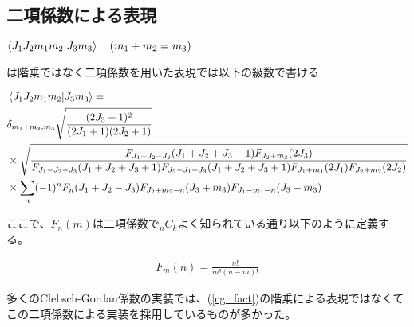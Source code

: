 \subsection{二項係数による表現}

\begin{comment}
この式の階乗の分数の部分を二項係数(binomial)にした公式もある
多くのCG係数を計算するコードでは二項係数で計算しているものがほとんどであった。

漸化式を再帰的に計算するよりも級数で直接計算する方法の方が効率が良い
階乗(factorial)を計算するよりも二項係数(binomial)で計算する方が良い
\end{comment}


$\bra{J_1 J_2 m_1 m_2}\ket{J_3 m_3} \quad (m_1 + m_2 = m_3)$

は階乗ではなく二項係数を用いた表現では以下の級数で書ける

\begin{align}\label{cg_binomial}
    &\bra{J_1 J_2 m_1 m_2}\ket{J_3 m_3} =  \\ \notag
    &\delta_{m_1+m_2, m_3}\sqrt{\frac{(2J_3 + 1)^2}{(2J_1 + 1)(2J_2 + 1)}} \\ \notag
    &\times
    \sqrt{\frac{ F_{J_1 + J_2 - J_3}(J_1 + J_2 + J_3 + 1)F_{J_3 + m_3}(2J_3)}
        {F_{J_1 - J_2 + J_3}(J_1 + J_2 + J_3 + 1)
    F_{J_2 - J_1 + J_3}(J_1 + J_2 + J_3 + 1)F_{J_1 + m_1}(2J_1)F_{J_2 + m_2}(2J_2) }} \\ \notag
    &\times 
     \sum_n
    (-1)^{n} F_n(J_1 + J_2 - J_3)F_{J_2 + m_2 - n}(J_3 + m_3)F_{J_1 - m_1 - n}(J_3 - m_3)
\end{align}

ここで、$F_{n}(m)$は二項係数で$_nC_k$よく知られている通り以下のように定義する。

\begin{align}
    F_m(n) = \frac{n!}{m!(n - m)!}
\end{align}

多くのClebsch-Gordan係数の実装では、(\ref{cg_fact})の階乗による表現ではなくてこの二項係数による実装を採用しているものが多かった。
